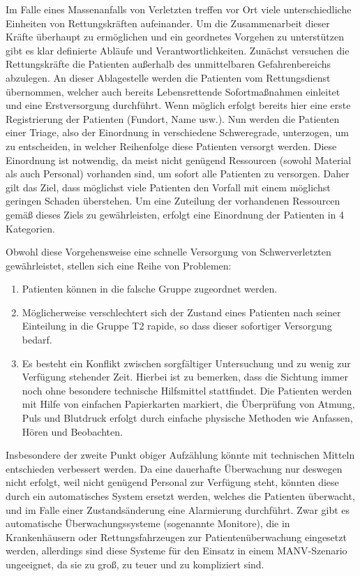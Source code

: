 Im Falle eines Massenanfalls von Verletzten treffen vor Ort viele unterschiedliche Einheiten von
Rettungskräften aufeinander. Um die Zusammenarbeit dieser Kräfte überhaupt zu ermöglichen und ein
geordnetes Vorgehen zu unterstützen gibt es klar definierte Abläufe und Verantwortlichkeiten. Zunächst
versuchen die Rettungskräfte die Patienten außerhalb des unmittelbaren Gefahrenbereichs abzulegen.
An dieser Ablagestelle werden die Patienten vom Rettungsdienst übernommen, welcher auch bereits
Lebensrettende Sofortmaßnahmen einleitet und eine Erstversorgung durchführt. Wenn möglich erfolgt
bereits hier eine erste Registrierung der Patienten (Fundort, Name usw.).
Nun werden die Patienten einer Triage, also der Einordnung in verschiedene Schweregrade,
unterzogen, um zu entscheiden, in welcher Reihenfolge diese Patienten versorgt werden.
Diese Einordnung ist notwendig, da meist nicht genügend Ressourcen (sowohl Material als auch
Personal) vorhanden sind, um sofort alle Patienten zu versorgen. Daher gilt das Ziel, dass möglichst
viele Patienten den Vorfall mit einem möglichst geringen Schaden überstehen. Um eine Zuteilung der
vorhandenen Ressourcen gemäß dieses Ziels zu gewährleisten, erfolgt eine Einordnung der Patienten in
4 Kategorien. 

Obwohl diese Vorgehensweise eine schnelle Versorgung von Schwerverletzten gewährleistet, stellen
sich eine Reihe von Problemen:

\begin{enumerate}
    \item Patienten können in die falsche Gruppe zugeordnet werden.
    \item Möglicherweise verschlechtert sich der Zustand eines Patienten nach seiner Einteilung in die Gruppe
          T2 rapide, so dass dieser sofortiger Versorgung bedarf.
    \item Es besteht ein Konflikt zwischen sorgfältiger Untersuchung und zu wenig zur Verfügung stehender
          Zeit.  Hierbei ist zu bemerken, dass die Sichtung immer noch ohne besondere technische Hilfsmittel
          stattfindet. Die Patienten werden mit Hilfe von einfachen Papierkarten markiert, die Überprüfung von
          Atmung, Puls und Blutdruck erfolgt durch einfache physische Methoden wie Anfassen, Hören und
          Beobachten.
\end{enumerate}

Insbesondere der zweite Punkt obiger Aufzählung könnte mit technischen Mitteln entschieden
verbessert werden. Da eine dauerhafte Überwachung nur deswegen nicht erfolgt, weil nicht genügend
Personal zur Verfügung steht, könnten diese durch ein automatisches System ersetzt werden, welches
die Patienten überwacht, und im Falle einer Zustandsänderung eine Alarmierung durchführt.
Zwar gibt es automatische Überwachungssysteme (sogenannte Monitore), die in Krankenhäusern oder
Rettungsfahrzeugen zur Patientenüberwachung eingesetzt werden, allerdings sind diese Systeme für
den Einsatz in einem MANV-Szenario ungeeignet, da sie zu groß, zu teuer und zu kompliziert sind.

